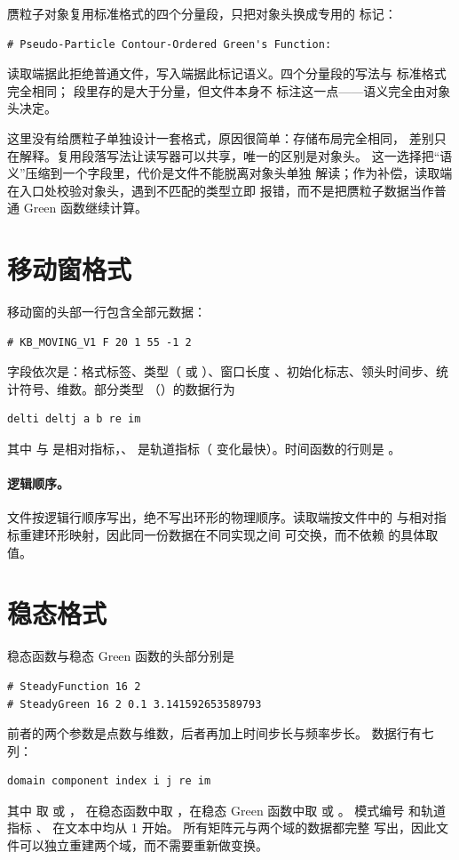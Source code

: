 赝粒子对象复用标准格式的四个分量段，只把对象头换成专用的
标记：
\begin{lstlisting}[numbers=none]
# Pseudo-Particle Contour-Ordered Green's Function:
\end{lstlisting}
读取端据此拒绝普通文件，写入端据此标记语义。四个分量段的写法与
标准格式完全相同； 段里存的是大于分量，但文件本身不
标注这一点——语义完全由对象头决定。

这里没有给赝粒子单独设计一套格式，原因很简单：存储布局完全相同，
差别只在解释。复用段落写法让读写器可以共享，唯一的区别是对象头。
这一选择把“语义”压缩到一个字段里，代价是文件不能脱离对象头单独
解读；作为补偿，读取端在入口处校验对象头，遇到不匹配的类型立即
报错，而不是把赝粒子数据当作普通 Green 函数继续计算。

\section{移动窗格式}
\label{sec:moving-format}

移动窗的头部一行包含全部元数据：
\begin{lstlisting}[numbers=none]
# KB_MOVING_V1 F 20 1 55 -1 2
\end{lstlisting}
字段依次是：格式标签、类型（ 或 ）、窗口长度
、初始化标志、领头时间步、统计符号、维数。部分类型
（）的数据行为
\begin{lstlisting}[numbers=none]
delti deltj a b re im
\end{lstlisting}
其中  与  是相对指标，、
是轨道指标（ 变化最快）。时间函数的行则是
。

\paragraph{逻辑顺序。}
文件按逻辑行顺序写出，绝不写出环形的物理顺序。读取端按文件中的
 与相对指标重建环形映射，因此同一份数据在不同实现之间
可交换，而不依赖  的具体取值。

\section{稳态格式}
\label{sec:steady-format}

稳态函数与稳态 Green 函数的头部分别是
\begin{lstlisting}[numbers=none]
# SteadyFunction 16 2
# SteadyGreen 16 2 0.1 3.141592653589793
\end{lstlisting}
前者的两个参数是点数与维数，后者再加上时间步长与频率步长。
数据行有七列：
\begin{lstlisting}[numbers=none]
domain component index i j re im
\end{lstlisting}
其中  取  或 ，
在稳态函数中取 ，在稳态 Green 函数中取  或 。
模式编号  和轨道指标 、 在文本中均从 1 开始。
所有矩阵元与两个域的数据都完整
写出，因此文件可以独立重建两个域，而不需要重新做变换。

